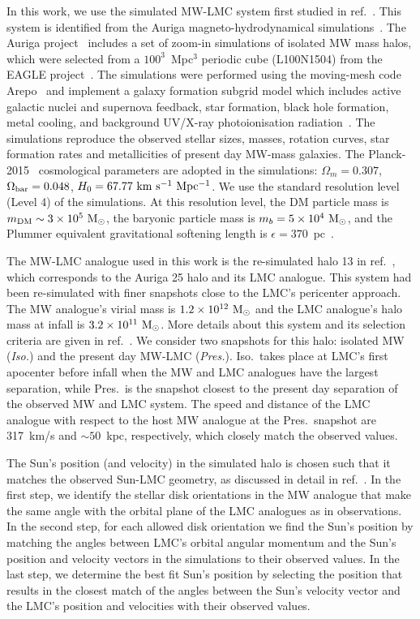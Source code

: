\documentclass[a4paper,11pt]{article}
\newcommand{\Msun}{{\rm M}_\odot}
\begin{document}
In this work, we use the simulated MW-LMC system first studied in ref.~\cite{Smith-Orlik:2023kyl}. This system is identified from the Auriga magneto-hydrodynamical simulations~\citep{Grand:2016mgo, Grand:2024}. The Auriga project~\citep{Grand:2016mgo} includes a set of zoom-in simulations of isolated MW mass halos, which were selected from a $100^3$~Mpc$^3$ periodic cube (L100N1504) from the EAGLE project~\cite{Schaye:2014tpa, Crain:2015poa}. The simulations were performed using the moving-mesh code Arepo~\citep{Springel:2009aa} and implement a galaxy formation subgrid model which includes active galactic nuclei and supernova feedback, star formation, black hole formation, metal cooling,   and background UV/X-ray photoionisation radiation~\cite{Grand:2016mgo}. The  simulations reproduce the observed stellar sizes, masses, rotation curves, star formation rates and metallicities of present day MW-mass galaxies. The Planck-2015~\citep{Planck:2015fie} cosmological parameters are adopted in the simulations: $\Omega_{m}=0.307$, $\Omega_{\rm bar}=0.048$, $H_0=67.77~{\rm km~s^{-1}~Mpc^{-1}}$. We use the standard resolution level (Level 4) of the simulations. At this resolution level, the DM particle mass is $m_{\rm DM} \sim 3\times 10^5~\Msun$, the baryonic particle mass is $m_b=5\times10^4~\Msun$, and the Plummer equivalent gravitational softening length is $\epsilon=370$~pc~\citep{Power:2002sw,Jenkins2013}.

The MW-LMC analogue used in this work is the re-simulated halo 13 in ref.~\cite{Smith-Orlik:2023kyl}, which corresponds to the Auriga 25 halo and its LMC analogue. This system had been re-simulated with finer snapshots close to the LMC's pericenter approach. The MW analogue's virial mass is $1.2 \times 10^{12}~\Msun$ and the LMC analogue's halo mass at infall is $3.2 \times 10^{11}~\Msun$. More details about this system and its selection criteria are given in ref.~\cite{Smith-Orlik:2023kyl}. We consider two snapshots for this halo: isolated MW (\emph{Iso.}) and the present day MW-LMC (\emph{Pres.}). Iso.~takes place at LMC's first apocenter before infall when the MW and LMC analogues have the largest separation, while Pres.~is the snapshot closest to the present day separation of the observed MW and LMC system.  The speed and distance of the LMC analogue with respect to the host MW analogue at the Pres.~snapshot  are 317~km/s and $\sim 50$~kpc, respectively, which closely match  the observed values. 


The Sun's position (and velocity) in the simulated halo is chosen such that it matches the observed Sun-LMC geometry, as discussed in detail in ref.~\cite{Smith-Orlik:2023kyl}. In the first step, we identify the stellar disk orientations in the MW analogue that make the same angle with the orbital plane of the LMC analogues as in observations. In the second step, for each allowed disk orientation we find the Sun's position by matching the angles between LMC's orbital angular momentum and the Sun's position and velocity vectors in the simulations to their observed values. In the last step, we determine the best fit Sun's position by selecting the position that results in the closest match of the angles between the Sun's velocity vector and the LMC's position and velocities with their observed values.
\end{document}
